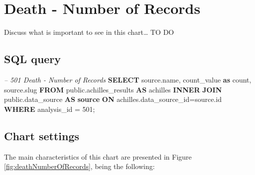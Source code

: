 \documentclass[]{book}
\newenvironment{Shaded}{\begin{snugshade}}{\end{snugshade}}
\newcommand{\KeywordTok}[1]{\textcolor[rgb]{0.13,0.29,0.53}{\textbf{#1}}}
\newcommand{\DecValTok}[1]{\textcolor[rgb]{0.00,0.00,0.81}{#1}}
\newcommand{\CommentTok}[1]{\textcolor[rgb]{0.56,0.35,0.01}{\textit{#1}}}
\newcommand{\FunctionTok}[1]{\textcolor[rgb]{0.00,0.00,0.00}{#1}}
\newcommand{\NormalTok}[1]{#1}
\begin{document}
\section{Death - Number of Records}\label{death---number-of-records}

Discuss what is important to see in this chart\ldots{} TO DO

\subsection{SQL query}\label{sql-query-15}

\begin{Shaded}
\begin{Highlighting}[]
\CommentTok{-- 501  Death - Number of Records}
\KeywordTok{SELECT}\NormalTok{ source.name,}
\NormalTok{       count_value }\KeywordTok{as} \FunctionTok{count}\NormalTok{, }
\NormalTok{       source.slug}
\KeywordTok{FROM}\NormalTok{ public.achilles_results }\KeywordTok{AS}\NormalTok{ achilles }
    \KeywordTok{INNER} \KeywordTok{JOIN}\NormalTok{ public.data_source }\KeywordTok{AS} \KeywordTok{source} \KeywordTok{ON} 
\NormalTok{      achilles.data_source_id=source.id}
\KeywordTok{WHERE}\NormalTok{ analysis_id = }\DecValTok{501}\NormalTok{;}
\end{Highlighting}
\end{Shaded}

\subsection{Chart settings}\label{chart-settings-15}

The main characteristics of this chart are presented in Figure
\ref{fig:deathNumberOfRecords}, being the following:
\end{document}
